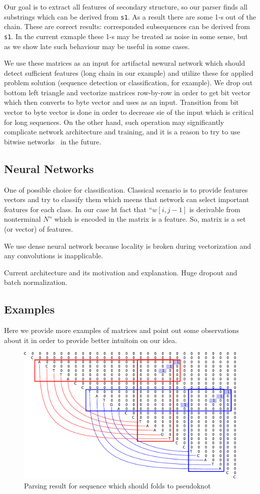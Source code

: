 \documentclass[a4paper,twoside]{article}
\begin{document}
Our goal is to extract all features of secondary structure, so our parser finds all substrings which can be derived from \verb|s1|.
As a result there are some 1-s out of the chain.
These are correct results: corresponded subsequences can be derived from \verb|s1|. 
In the current exmaple these 1-s may be treated as noise in some sense, but as we show late such behaviour may be useful in some cases.

We use these matrices as an input for artifactal newural network which should detect sufficient features (long chain in our example) and utilize these for applied problem solution (sequence detection or classification, for example).
We drop out bottom left triangle and vectorize matrices row-by-row in order to get bit vector which then converts to byte vector and uses as an input.
Transition from bit vector to byte vector is done in order to decrease sie of the input which is critical for long sequences. 
On the other hand, such operation may significantly complicate network architecture and training, and it is a reason to try to use bitwise networks~\cite{DBLP:journals:corr:KimS16} in the future.  

\subsection{Neural Networks}

\noindent One of possible choice for classification.
Classical scenario is to provide features vectors and try to classify them which meens that network can select important features for each class.
In our case ht fact that ``$w[i,j-1]$ is derivable from nonterminal $N$'' which is encoded in the matrix is a feature.
So, matrix is a set (or vector) of features.

We use dense neural network because locality is broken during vectorization and any convolutions is inapplicable.

Current architecture and its motivation and explanation.
Huge dropout and batch normalization.

\subsection{Examples}
\label{sec:examples}

\noindent Here we provide more examples of matrices and point out some observations about it in order to provide better intuitoin on our idea.

\begin{figure}
\centering
\includegraphics[width=.5\textwidth]{figures/5.pdf}
\caption{Parsing result for sequence which should folds to pseudoknot}
\label{fig:pseudoknot}
\end{figure}
\end{document}
